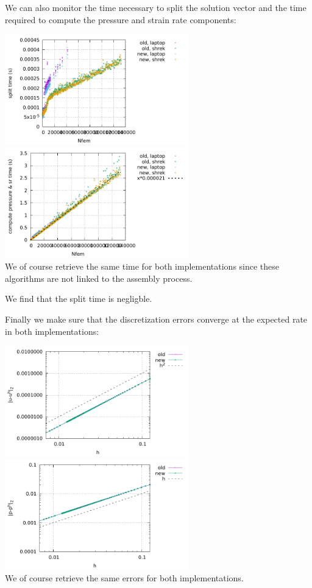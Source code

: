 \newpage
We can also monitor the time necessary to split the solution vector
and the time required to compute the pressure and strain rate components:
\begin{center}
\includegraphics[width=8cm]{python_codes/fieldstone_176/results/split.pdf}
\includegraphics[width=8cm]{python_codes/fieldstone_176/results/compute_press_sr.pdf}\\
{\captionfont We of course retrieve the same time for both implementations since
these algorithms are not linked to the assembly process.}
\end{center}
We find that the split time is negligble. 


Finally we make sure that the discretization errors converge at the expected rate
in both implementations:
\begin{center}
\includegraphics[width=8cm]{python_codes/fieldstone_176/results/errv.pdf}
\includegraphics[width=8cm]{python_codes/fieldstone_176/results/errp.pdf}\\
{\captionfont We of course retrieve the same errors for both implementations.}
\end{center}
